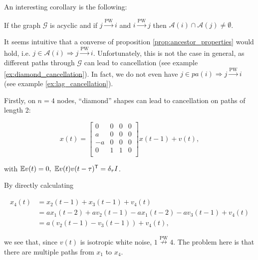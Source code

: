 \documentclass[12pt]{article}
\def\pwgc{\overset{\text{PW}}{\rightarrow}}  %
\def\npwgc{\overset{\text{PW}}{\nrightarrow}}  %
\def\gcg{\mathcal{G}}  %
\newcommand{\pa}[1]{pa(#1)}  %
\newcommand{\anc}[1]{\mathcal{A}(#1)}  %
\begin{document}
An interesting corollary is the following:

\begin{corollary}
  If the graph $\gcg$ is acyclic and if $j \pwgc i$ and $i \pwgc j$ then $\anc{i} \cap \anc{j} \ne \emptyset$.
\end{corollary}

It seems intuitive that a converse of proposition \ref{prop:ancestor_properties}
would hold, i.e. $j \in \anc{i} \Rightarrow j \pwgc i$.  Unfortunately,
this is not the case in general, as different paths through $\gcg$ can
lead to cancellation (see example \ref{ex:diamond_cancellation}).  In
fact, we do not even have $j \in \pa{i} \Rightarrow j \pwgc i$ (see
example \ref{ex:lag_cancellation}).

\begin{example}
  \label{ex:diamond_cancellation}
  Firstly, on $n = 4$ nodes, ``diamond'' shapes can lead to cancellation on paths of length 2:

\begin{equation*}
  x(t) =
  \left[
    \begin{array}{cccc}
      0 & 0 & 0 & 0\\
      a & 0 & 0 & 0\\
      -a & 0 & 0 & 0\\
      0 & 1 & 1 & 0\\
    \end{array}
  \right] x(t - 1) + v(t),
\end{equation*}

with $\mathbb{E} v(t) = 0,\ \mathbb{E} v(t)v(t - \tau)^{\mathsf{T}} = \delta_\tau I$.

By directly calculating

\begin{align*}
  x_4(t) &= x_2(t - 1) + x_3(t - 1) + v_4(t)\\
         &= ax_1(t - 2) + av_2(t - 1) - ax_1(t - 2) -av_3(t - 1) + v_4(t)\\
         &= a(v_2(t - 1) - v_3(t - 1)) + v_4(t),
\end{align*}

we see that, since $v(t)$ is isotropic white noise, $1 \npwgc 4$.  The problem here is that there are multiple paths from $x_1$ to $x_4$.
\end{example}
\end{document}
